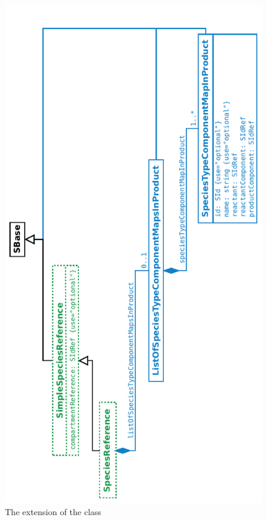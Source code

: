 \begin{figure}[htb]
  \begin{center}
    \includegraphics[angle=-90, scale=0.8]{./figs/multi_011_SpeciesReference.pdf}
    \caption{The extension of the \ExSpeciesReference class}
  \label{fig:ExSpeciesReference}
  \end{center}
\end{figure}


